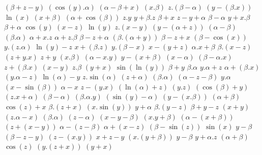 $ (\beta + z - y) $
$ (\cos(y) . \alpha) $
$ (\alpha - \beta + x) $
$ (x . \beta) $
$ z . (\beta - \alpha) $
$ (y - (\beta . x)) $
$ \ln(x) $
$ (x + \beta) $
$ (\alpha + \cos(\beta)) $
$ z . y $
$ y + \beta . z $
$ \beta + x $
$ z - y + \alpha $
$ \beta - \alpha $
$ y + x . \beta $
$ \beta + \alpha $
$ \cos(y) $
$ (x - z) $
$ \ln(y) $
$ z . (x - y) $
$ (y - (\alpha + z)) $
$ (\alpha - \beta) $
$ (\beta . \alpha) $
$ \alpha + x . z $
$ \alpha + z . \beta $
$ \beta - z + \alpha $
$ (\beta . (\alpha + y)) $
$ \beta - z + x $
$ (\beta - \cos(x)) $
$ y . (z . \alpha) $
$ \ln(y) - z $
$ x + (\beta . z) $
$ y . (\beta - x) $
$ x - (y + z) $
$ \alpha . x + \beta $
$ \beta . (x - z) $
$ (z + y . x) $
$ z + y $
$ (x . \beta) $
$ (\alpha - x . y) $
$ y - (x + \beta) $
$ (x - \alpha) $
$ (\beta - \alpha . x) $
$ z + (\beta . x) $
$ (x - y) $
$ z . \beta $
$ (y + x) $
$ \sin(\ln(y)) $
$ \beta + y $
$ \beta . \alpha $
$ y . \alpha + z $
$ \alpha + (\beta . x) $
$ (y . \alpha - z) $
$ \ln(\alpha) - y $
$ z . \sin(\alpha) $
$ (z + \alpha) $
$ (\beta . \alpha) $
$ (\alpha - z - \beta) $
$ y . \alpha $
$ (x - \sin(\beta)) $
$ \alpha - x $
$ z - (y . x) $
$ (\ln(\alpha) + z) $
$ (y . z) $
$ (\cos(\beta) + y) $
$ (z . x + \alpha) $
$ (\beta - \alpha) $
$ (\beta . \alpha . y) $
$ (\sin(y) - \alpha) $
$ (y - (x . \beta)) $
$ (\alpha + \beta) $
$ \cos(z) + x $
$ \beta . (z + x) $
$ (x . \sin(y)) $
$ y + \alpha $
$ \beta . (y - z) $
$ \beta + y - z $
$ (x + y) $
$ (z . \alpha - x) $
$ (\beta . \alpha) $
$ (z - \alpha) $
$ (x - y - \beta) $
$ (x . y + \beta) $
$ (\alpha - (x + \beta)) $
$ (z + (x - y)) $
$ \alpha - (z - \beta) $
$ \alpha + (x - z) $
$ (\beta - \sin(z)) $
$ \sin(x) $
$ y - \beta $
$ (\beta - z - y) $
$ (z - (x . y)) $
$ x + z - y $
$ (x . (y + \beta)) $
$ y - \beta $
$ y + \alpha . z $
$ (\alpha + \beta) $
$ \cos(z) $
$ (y . (z + x)) $
$ (y + x) $
